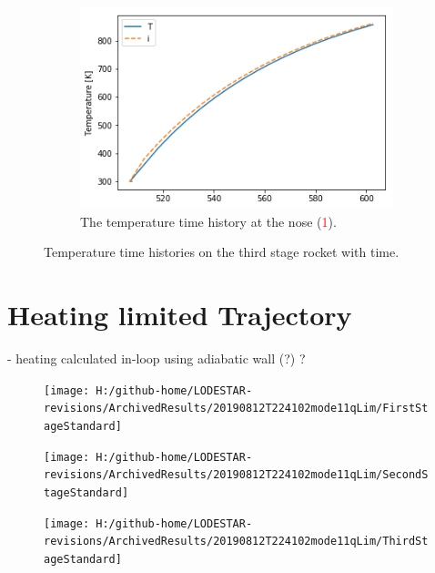\begin{figure}[ht]
	\begin{subfigure}{.5\textwidth}
		\centering
		\includegraphics[width=0.99\linewidth]{figures/A1_uncertainty-analysis/TNose3}
		\caption{The temperature time history at the nose (\textcolor{red}{1}).}
		
	\end{subfigure}
	
		\caption{Temperature time histories on the third stage rocket with time.}
		\label{fig:TrajTemp3}
	\end{figure}

\section{Heating limited Trajectory}

- heating calculated in-loop using adiabatic wall (?) ?

\begin{figure}[!ht]
\centering
\texttt{[image: H:/github-home/LODESTAR-revisions/ArchivedResults/20190812T224102mode11qLim/FirstStageStandard]}
\caption{}
\label{fig:FirstStageStandardqlim}
\end{figure}



\begin{figure}[!ht]
\centering
\texttt{[image: H:/github-home/LODESTAR-revisions/ArchivedResults/20190812T224102mode11qLim/SecondStageStandard]}
\caption{}
\label{fig:SecondStageStandardqlim}
\end{figure}

\begin{figure}[!ht]
\centering
\texttt{[image: H:/github-home/LODESTAR-revisions/ArchivedResults/20190812T224102mode11qLim/ThirdStageStandard]}
\caption{}
\label{fig:ThirdStageStandardqlim}
\end{figure}

